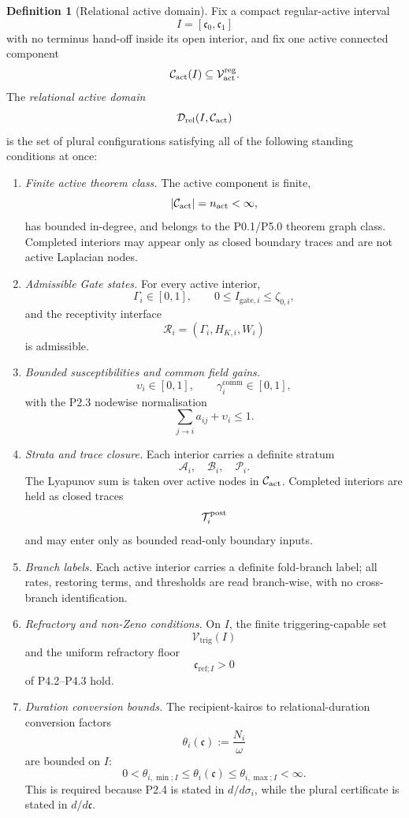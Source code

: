 \documentclass[11pt,a4paper]{article}
\theoremstyle{definition}
\newtheorem{definition}{Definition}[section]
\theoremstyle{plain}
\theoremstyle{remark}
\begin{document}
\begin{definition}[Relational active domain]\label{def:domain}
Fix a compact regular-active interval
\[
I=[\mathfrak c_0,\mathfrak c_1]
\]
with no terminus hand-off inside its open interior, and fix one active connected
component
\[
\mathcal C_{\rm act}(I)\subseteq\mathcal V_{\rm act}^{\rm reg}.
\]
The \emph{relational active domain}
\[
\mathcal D_{\mathrm{rel}}(I,\mathcal C_{\rm act})
\]
is the set of plural configurations satisfying all of the following standing
conditions at once:
\begin{enumerate}[label=\textup{(\arabic*)},leftmargin=1.2cm]
\item \emph{Finite active theorem class.}
The active component is finite,
\[
|\mathcal C_{\rm act}|=n_{\rm act}<\infty,
\]
has bounded in-degree, and belongs to the P0.1/P5.0 theorem graph class. Completed
interiors may appear only as closed boundary traces and are not active Laplacian
nodes.

\item \emph{Admissible Gate states.}
For every active interior,
\[
\Gamma_i\in[0,1],
\qquad
0\le I_{\mathrm{gate},i}\le\zeta_{0,i},
\]
and the receptivity interface
\[
\mathcal R_i=(\Gamma_i,H_{K,i},W_i)
\]
is admissible.

\item \emph{Bounded susceptibilities and common field gains.}
\[
\upsilon_i\in[0,1],
\qquad
\gamma_i^{\mathrm{comm}}\in[0,1],
\]
with the P2.3 nodewise normalisation
\[
\sum_{j\to i}a_{ij}+\upsilon_i\le1.
\]

\item \emph{Strata and trace closure.}
Each interior carries a definite stratum
\[
\mathcal A_i,\quad \mathcal B_i,\quad \mathcal P_i.
\]
The Lyapunov sum is taken over active nodes in
\(\mathcal C_{\rm act}\). Completed interiors are held as closed traces
\[
\mathcal T_i^{\rm post}
\]
and may enter only as bounded read-only boundary inputs.

\item \emph{Branch labels.}
Each active interior carries a definite fold-branch label; all rates, restoring
terms, and thresholds are read branch-wise, with no cross-branch identification.

\item \emph{Refractory and non-Zeno conditions.}
On \(I\), the finite triggering-capable set
\[
\mathcal V_{\mathrm{trig}}(I)
\]
and the uniform refractory floor
\[
\mathfrak c_{\mathrm{ref};I}>0
\]
of P4.2--P4.3 hold.

\item \emph{Duration conversion bounds.}
The recipient-kairos to relational-duration conversion factors
\[
\theta_i(\mathfrak c):=\frac{N_i}{\omega}
\]
are bounded on \(I\):
\[
0<\theta_{i,\min;I}
\le
\theta_i(\mathfrak c)
\le
\theta_{i,\max;I}<\infty.
\]
This is required because P2.4 is stated in \(d/d\sigma_i\), while the plural
certificate is stated in \(d/d\mathfrak c\).


\end{enumerate}
\end{definition}
\end{document}
